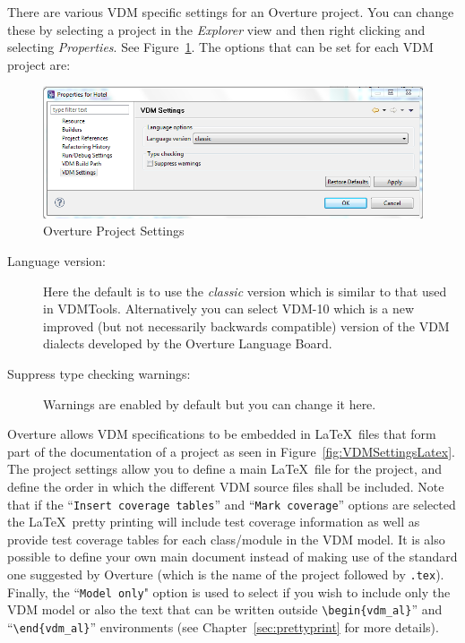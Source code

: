 \documentclass{overturerepchap}
\begin{document}
There are various VDM
specific settings for an Overture project. You can change these by
selecting a project
in the \emph{Explorer} view and then right clicking and selecting
\emph{Properties}. See Figure~\ref{fig:VDMSettings}. The options
that can be set for each VDM project are:

\begin{figure}[!hbt]
\begin{center}
  \includegraphics[width=\textwidth]{screenDumps/projectsettings}
  \caption[Overture Project Settings]{Overture Project Settings}
  \label{fig:VDMSettings}
\end{center}
\end{figure}

\begin{description}
\item[Language version:] Here the default is to use the
  \emph{classic} version which is similar to that used in
  VDMTools. Alternatively you can select VDM-10 which
  is a new improved (but not necessarily backwards compatible) version of
  the VDM dialects developed by the Overture Language Board.
\item[Suppress type checking warnings:] Warnings are enabled
  by default but you can change it here.
\end{description}

Overture allows VDM specifications to be embedded in \LaTeX\ files that
form part of the documentation of a project as seen in
Figure~\ref{fig:VDMSettingsLatex}. The project settings allow you
to define a main \LaTeX\ file for the project, and define the order in which the
different VDM source files shall be included. Note that if the
``\texttt{Insert coverage tables}'' and ``\texttt{Mark coverage}''
options are selected the \LaTeX\ pretty printing will include test
coverage information as well as provide test coverage tables for each
class/module in the VDM model. It is also possible to define your own
main document instead of making use of the standard one suggested by
Overture (which is the name of the project followed by \texttt{.tex}). 
Finally, the ``\texttt{Model only}" option is used to select if you 
wish to include only the VDM model or also the text that can be written
outside \verb+\begin{vdm_al}+'' and ``\verb+\end{vdm_al}+'' environments 
(see Chapter~\ref{sec:prettyprint} for more details).
\end{document}
